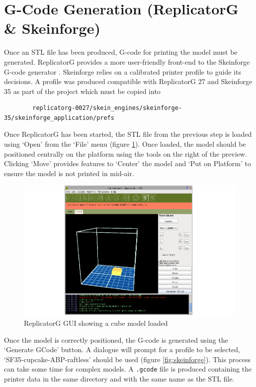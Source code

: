 	\section{G-Code Generation (ReplicatorG \& Skeinforge)}
		
		Once an STL file has been produced, G-code for printing the model must be
		generated. ReplicatorG provides a more user-friendly front-end to the
		Skeinforge G-code generator \cite{replicatorg}. Skeinforge relies on a
		calibrated printer profile to guide its decisions. A profile was produced
		compatible with ReplicatorG 27 and Skeinforge 35 as part of the project
		which must be copied into \begin{verbatim}
		replicatorg-0027/skein_engines/skeinforge-35/skeinforge_application/prefs
		\end{verbatim}
		
		Once ReplicatorG has been started, the STL file from the previous step is
		loaded using `Open' from the `File' menu (figure \ref{fig:replicatorG}).
		Once loaded, the model should be positioned centrally on the platform using
		the tools on the right of the preview. Clicking `Move' provides features to
		`Center' the model and `Put on Platform' to ensure the model is not
		printed in mid-air.
		
		\begin{figure}
			\includegraphics[width=1\textwidth]{diagrams/replicatorG.pdf}
			\caption{ReplicatorG GUI showing a cube model loaded}
			\label{fig:replicatorG}
		\end{figure}
		
		Once the model is correctly positioned, the G-code is generated using the
		`Generate GCode' button. A dialogue will prompt for a profile to be
		selected, `SF35-cupcake-ABP-raftless' should be used (figure
		\ref{fig:skeinforge}). This process can take some time for complex models.
		A \verb|.gcode| file is produced containing the printer data in the same
		directory and with the same name as the STL file.
		
